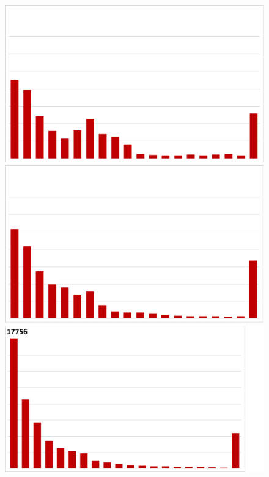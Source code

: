 \begin{figure}
\begin{minipage}[t]{0.66\linewidth}
\begin{framed}
\begin{minipage}[t]{0.24\textwidth}
\vspace{-2mm}
\end{minipage}
\begin{minipage}[t]{0.24\textwidth}%
\includegraphics[width=0.95\linewidth, trim={0cm 0cm 2.5cm 0cm}, clip]{results/nyx/Lag25_1_Max.pdf}
\vspace{-2mm}
\end{minipage}%
\hfill
\begin{minipage}[t]{0.24\textwidth}%
\includegraphics[width=0.95\linewidth, trim={0cm 0cm 2.5cm 0cm}, clip]{results/nyx/Lag50_1_Max.pdf}
\vspace{-2mm}
\end{minipage}
\begin{minipage}[t]{0.24\textwidth}%
\includegraphics[width=0.95\linewidth, trim={0cm 0cm 2.5cm 0cm}, clip]{results/nyx/Lag100_1_Max.pdf}

\end{minipage}
\end{framed}
\end{minipage}
\end{figure}

